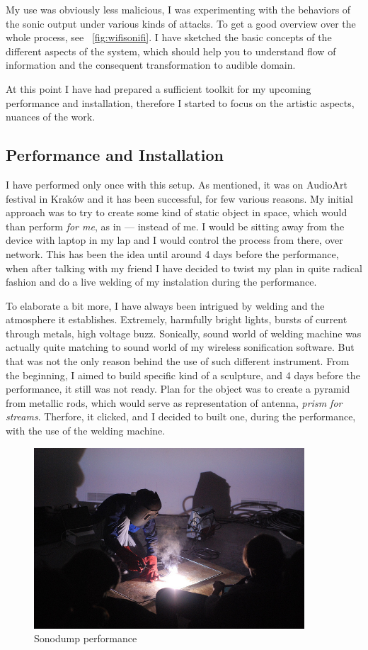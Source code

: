 \documentclass[12pt,a4paper,oneside]{report}
\begin{document}
My use was obviously less malicious, I was experimenting with the behaviors of the sonic output under various kinds of attacks. To get a good overview over the whole process, see ~\ref{fig:wifisonifi}. I have sketched the basic concepts of the different aspects of the system, which should help you to understand flow of information and the consequent transformation to audible domain.

At this point I have had prepared a sufficient toolkit for my upcoming performance and installation, therefore I started to focus on the artistic aspects, nuances of the work.

\subsection{Performance and Installation}
I have performed only once with this setup. As mentioned, it was on AudioArt festival in Kraków and it has been successful, for few various reasons. My initial approach was to try to create some kind of static object in space, which would than perform \emph{for me}, as in --- instead of me. I would be sitting away from the device with laptop in my lap and I would control the process from there, over network. This has been the idea until around 4 days before the performance, when after talking with my friend I have decided to twist my plan in quite radical fashion and do a live welding of my instalation during the performance.

To elaborate a bit more, I have always been intrigued by welding and the atmosphere it establishes. Extremely, harmfully bright lights, bursts of current through metals, high voltage buzz. Sonically, sound world of welding machine was actually quite matching to sound world of my wireless sonification software. But that was not the only reason behind the use of such different instrument. From the beginning, I aimed to build specific kind of a sculpture, and 4 days before the performance, it still was not ready. Plan for the object was to create a pyramid from metallic rods, which would serve as representation of antenna, \textit{prism for streams}. Therfore, it clicked, and I decided to built one, during the performance, with the use of the welding machine.

\begin{figure}  
  \centering
    \includegraphics[width=0.9\textwidth]{img/zvarac}
	\caption{Sonodump performance}
	\label{fig:zvarac}
\end{figure}
\end{document}
